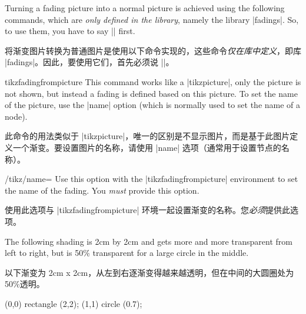 Turning a fading picture into a normal picture is achieved using the following
commands, which are \emph{only defined in the library}, namely the library
|fadings|. So, to use them, you have to say |\usetikzlibrary{fadings}| first.

将渐变图片转换为普通图片是使用以下命令实现的，这些命令\emph{仅在库中定义}，即库 |fadings|。因此，要使用它们，首先必须说 |\usetikzlibrary{fadings}|。

\begin{environment}{{tikzfadingfrompicture}}
    This command works like a |{tikzpicture}|, only the picture is not shown,
    but instead a fading is defined based on this picture. To set the name of
    the picture, use the |name| option (which is normally used to set the name
    of a node).
    
    此命令的用法类似于 |{tikzpicture}|，唯一的区别是不显示图片，而是基于此图片定义一个渐变。要设置图片的名称，请使用 |name| 选项（通常用于设置节点的名称）。


    \begin{key}{/tikz/name=}
        Use this option with the |{tikzfadingfrompicture}| environment to set
        the name of the fading. You \emph{must} provide this option.

        使用此选项与 |{tikzfadingfrompicture}| 环境一起设置渐变的名称。您\emph{必须}提供此选项。

    \end{key}

    The following shading is 2cm by 2cm and gets more and more transparent from
    left to right, but is 50\% transparent for a large circle in the middle.
    
    以下渐变为 2cm x 2cm，从左到右逐渐变得越来越透明，但在中间的大圆圈处为 50\%透明。



{\ifpgfmanualexternalize\tikzexternaldisable\fi
\begin{codeexample}[preamble={\usetikzlibrary{fadings,patterns}}]
\begin{tikzfadingfrompicture}[name=fade right with circle]
  \shade[left color=transparent!0,
         right color=transparent!100] (0,0) rectangle (2,2);
  \fill[transparent!50] (1,1) circle (0.7);
\end{tikzfadingfrompicture}

\end{codeexample}}
\end{environment}
